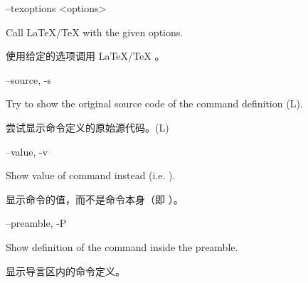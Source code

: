 \documentclass{article}
\newenvironment{options}{%
    \def\cstart{\begingroup\ttfamily\par\noindent\ignorespaces}%
    \def\csep{\endgroup\begingroup\list {}{}\item \relax}%
    \def\cend{\endlist\par\medskip\endgroup\cstart}%
    \cstart
}{%
    \endgroup
}
\begin{document}



\begin{options}
--texoptions \MacroArgs<options>                   

\csep Call \LaTeX/\TeX{} with the given options.

使用给定的选项调用 \LaTeX/\TeX{} 。
\cend
\end{options}

\begin{options}
  --source, -s                                       \csep 
Try to show the original source code of the command definition (L).

尝试显示命令定义的原始源代码。(L)
\cend
\end{options}


\begin{options}
  --value, -v                                        \csep 
  Show value of command instead (i.e. \Macro\the\AlsoMacro\command).

  显示命令的值，而不是命令本身（即 \Macro\the\AlsoMacro\command）。
  \cend
\end{options}


\begin{options}
  --preamble, -P                                     \csep 
  Show definition of the command inside the preamble.

  显示导言区内的命令定义。
  \cend
\end{options}
\end{document}
